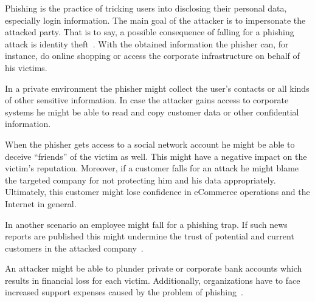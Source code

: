 \begin{description}[leftmargin=0cm]
	\item[Identity Theft:] Phishing is the practice of tricking users into disclosing their personal data, especially login information. The main goal of the attacker is to impersonate the attacked party. That is to say, a possible consequence of falling for a phishing attack is identity theft~\cite{jakobsson2006phishing}. With the obtained information the phisher can, for instance, do online shopping or access the corporate infrastructure on behalf of his victims.
	\item[Data Theft:]
	 In a private environment the phisher might collect the user's contacts or all kinds of other sensitive information.
In case the attacker gains access to corporate systems he might be able to read and copy customer data or other confidential information.
 	\item[Reputational Damage:]
 	When the phisher gets access to a social network account he might be able to deceive ``friends'' of the victim as well. This might have a negative impact on the victim's reputation.
 	 Moreover, if a customer falls for an attack he might blame the targeted company for not protecting him and his data appropriately. 
 	 Ultimately, this customer might lose confidence in eCommerce operations and the Internet in general.

In another scenario an employee might fall for a phishing trap.
If such news reports are published this might undermine the trust of potential and current customers in the attacked company~\cite{mcafee, redcondor}. 
	\item[Financial Loss:]
	An attacker might be able to plunder private or corporate bank accounts which results in financial loss for each victim. Additionally, organizations have to face increased support expenses caused by the problem of phishing~\cite{rsa2013, mcafee}.
\end{description}
 
